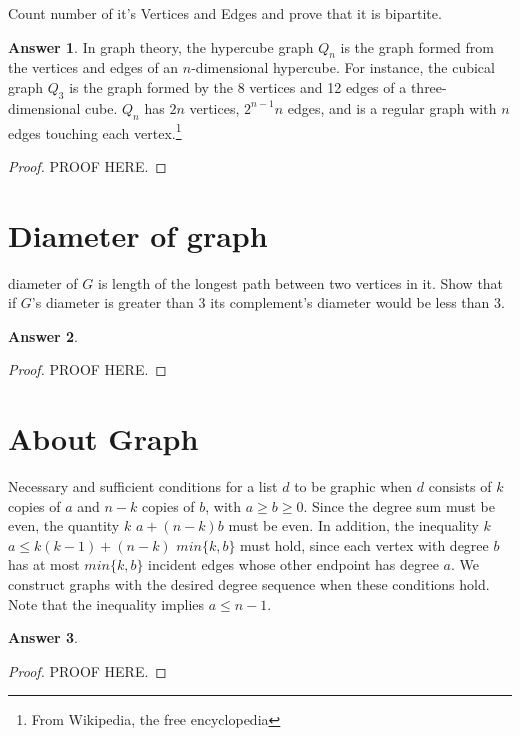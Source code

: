 \documentclass[a4paper]{article}
\renewcommand{\(}{\left(}
\renewcommand{\)}{\right)}
\theoremstyle{plain}
\theoremstyle{plain}
\theoremstyle{definition}
\newtheorem*{answer}{Answer}
\begin{document}
Count number of it's Vertices and Edges and prove that it is bipartite.
\begin{shaded}
\begin{answer}
In graph theory, the hypercube graph $Q_n$ is the graph formed from the vertices and edges of an $n$-dimensional hypercube. For instance, the cubical graph $Q_3$ is the graph formed by the 8 vertices and 12 edges of a three-dimensional cube. $Q_n$ has $2n$ vertices, $2^{n-1}n$ edges, and is a regular graph with $n$ edges touching each vertex.\footnote{
From Wikipedia, the free encyclopedia%
}
\begin{proof}
PROOF HERE.
\end{proof}
\end{answer}
\end{shaded}

\section{Diameter of graph}
diameter of $G$ is length of the longest path between two vertices in it.
Show that if $G$'s diameter is greater than 3 its complement's diameter would be less than 3.
\begin{shaded}
\begin{answer}
\begin{proof}
PROOF HERE.
\end{proof}
\end{answer}
\end{shaded}

\section{About Graph}
Necessary and sufficient conditions for a list $d$ to be graphic when $d$ consists of $k$ copies of $a$ and $n − k$ copies of $b$, with $a \geq b \geq 0$. Since the degree sum must be even, the quantity $k$ $a + (n − k)b$ must be even. In addition, the inequality $k$ $a \leq k(k − 1) + (n − k)$ $min\{k, b\}$ must hold, since each vertex with degree $b$ has at most $min\{k, b\}$ incident edges whose other endpoint has degree $a$. We construct graphs with the desired degree sequence when these conditions hold. Note that the inequality implies $a \leq n − 1$.
\begin{shaded}
\begin{answer}
\begin{proof}
PROOF HERE.
\end{proof}
\end{answer}
\end{shaded}
\end{document}
